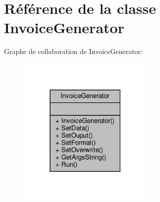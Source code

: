 \hypertarget{class_invoice_generator}{}\section{Référence de la classe Invoice\+Generator}
\label{class_invoice_generator}


Graphe de collaboration de Invoice\+Generator\+:\nopagebreak
\begin{figure}[H]
\begin{center}
\leavevmode
\includegraphics[width=186pt]{class_invoice_generator__coll__graph}
\end{center}
\end{figure}
